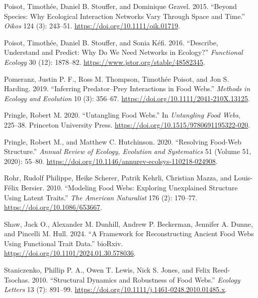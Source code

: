 \documentclass[
  letterpaper,
  DIV=11,
  numbers=noendperiod]{scrartcl}
\newlength{\cslhangindent}
\newenvironment{CSLReferences}[2] %
 {\begin{list}{}{%
  \setlength{\itemindent}{0pt}
  \setlength{\leftmargin}{0pt}
  \setlength{\parsep}{0pt}
  \ifodd #1
   \setlength{\leftmargin}{\cslhangindent}
   \setlength{\itemindent}{-1\cslhangindent}
  \fi
  \setlength{\itemsep}{#2\baselineskip}}}
 {\end{list}}
\begin{document}
\begin{CSLReferences}{1}{0}
Poisot, Timothée, Daniel B. Stouffer, and Dominique Gravel. 2015.
{``Beyond Species: Why Ecological Interaction Networks Vary Through
Space and Time.''} \emph{Oikos} 124 (3): 243--51.
\url{https://doi.org/10.1111/oik.01719}.

Poisot, Timothée, Daniel B. Stouffer, and Sonia Kéfi. 2016. {``Describe,
Understand and Predict: Why Do We Need Networks in Ecology?''}
\emph{Functional Ecology} 30 (12): 1878--82.
\url{https://www.jstor.org/stable/48582345}.

Pomeranz, Justin P. F., Ross M. Thompson, Timothée Poisot, and Jon S.
Harding. 2019. {``Inferring Predator--Prey Interactions in Food Webs.''}
\emph{Methods in Ecology and Evolution} 10 (3): 356--67.
\url{https://doi.org/10.1111/2041-210X.13125}.

Pringle, Robert M. 2020. {``Untangling {Food Webs}.''} In
\emph{Untangling {Food Webs}}, 225--38. Princeton University Press.
\url{https://doi.org/10.1515/9780691195322-020}.

Pringle, Robert M., and Matthew C. Hutchinson. 2020. {``Resolving
{Food-Web Structure}.''} \emph{Annual Review of Ecology, Evolution and
Systematics} 51 (Volume 51, 2020): 55--80.
\url{https://doi.org/10.1146/annurev-ecolsys-110218-024908}.

Rohr, Rudolf Philippe, Heike Scherer, Patrik Kehrli, Christian Mazza,
and Louis-Félix Bersier. 2010. {``Modeling {Food Webs}: {Exploring
Unexplained Structure Using Latent Traits}.''} \emph{The American
Naturalist} 176 (2): 170--77. \url{https://doi.org/10.1086/653667}.

Shaw, Jack O., Alexander M. Dunhill, Andrew P. Beckerman, Jennifer A.
Dunne, and Pincelli M. Hull. 2024. {``A Framework for Reconstructing
Ancient Food Webs Using Functional Trait Data.''} bioRxiv.
\url{https://doi.org/10.1101/2024.01.30.578036}.

Staniczenko, Phillip P. A., Owen T. Lewis, Nick S. Jones, and Felix
Reed-Tsochas. 2010. {``Structural Dynamics and Robustness of Food
Webs.''} \emph{Ecology Letters} 13 (7): 891--99.
\url{https://doi.org/10.1111/j.1461-0248.2010.01485.x}.


\end{CSLReferences}
\end{document}

